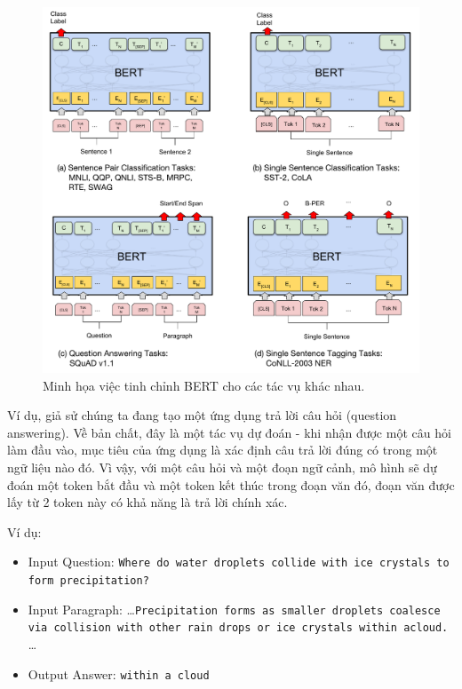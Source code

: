 \begin{figure}[htb]
    \centering
    \includegraphics[width=\textwidth]{image/BERT_fine_tune.pdf}
    \caption{Minh họa việc tinh chỉnh BERT cho các tác vụ khác nhau.}
    \label{figure:BERT_fine_tuning}
\end{figure}

Ví dụ, giả sử chúng ta đang tạo một ứng dụng trả lời câu hỏi (question answering). Về bản chất, đây là một tác vụ dự đoán - khi nhận được một câu hỏi làm đầu vào, mục tiêu của ứng dụng là xác định câu trả lời đúng có trong một ngữ liệu nào đó. Vì vậy, với một câu hỏi và một đoạn ngữ cảnh, mô hình sẽ dự đoán một token bắt đầu và một token kết thúc trong đoạn văn đó, đoạn văn được lấy từ 2 token này có khả năng là trả lời chính xác.

Ví dụ:

\begin{itemize}
    \item Input Question:
          {\tt Where do water droplets collide with ice crystals to form precipitation?}

    \item Input Paragraph:
          \dots {\tt Precipitation forms as smaller droplets coalesce via collision with other rain drops or ice crystals within a\newline cloud.} \dots

    \item Output Answer:
          {\tt within a cloud}
\end{itemize}

